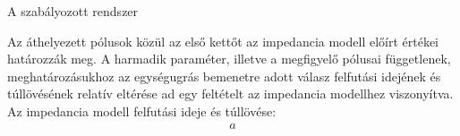 A szabályozott rendszer 

Az áthelyezett pólusok közül az első kettőt az impedancia modell
előírt értékei határozzák meg. A harmadik paraméter, illetve a megfigyelő pólusai függetlenek, meghatározásukhoz az egységugrás bemenetre 
adott válasz felfutási idejének és túllövésének relatív eltérése ad egy feltételt az impedancia modellhez 
viszonyítva. Az impedancia modell felfutási ideje és túllövése:
\begin{align}
    a
\end{align}
